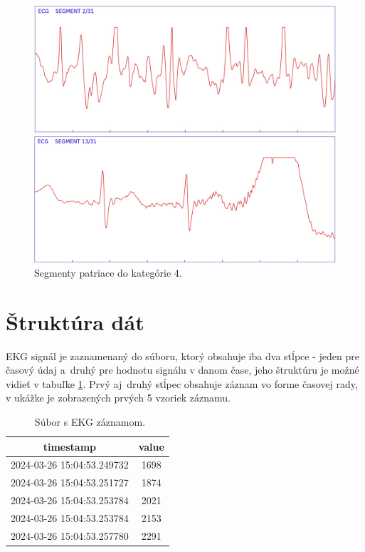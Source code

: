 \begin{figure}[H]
    \centering    
    \includegraphics[scale=0.25]{img/artefact_4.jpeg}
    \par \vspace{0.25cm}
    \includegraphics[scale=0.25]{img/artefact_4_1.jpeg}
    \caption{Segmenty patriace do kategórie 4.}
    \label{fig:artefact_4}
\end{figure}

\newpage


\section{Štruktúra dát}

EKG signál je zaznamenaný do súboru, ktorý obsahuje iba dva stĺpce - jeden pre časový údaj a~druhý pre hodnotu signálu v danom čase, jeho štruktúru je možné vidieť v tabuľke \ref{tab:input}. Prvý aj~druhý stĺpec obsahuje záznam vo forme časovej rady, v ukážke je zobrazených prvých 5 vzoriek záznamu.

\begin{table}[H]\centering
\caption[Súbor s EKG záznamom.]{~Súbor s EKG záznamom.}\label{tab:input}
    \begin{tabular}{c|c}
    	\textbf{timestamp} 	        & \textbf{value}   \tabularnewline \hline 
     	2024-03-26 15:04:53.249732  & 1698	           \tabularnewline \hline
     	2024-03-26 15:04:53.251727 	& 1874	           \tabularnewline \hline
        2024-03-26 15:04:53.253784 	& 2021	           \tabularnewline \hline
        2024-03-26 15:04:53.253784  & 2153	           \tabularnewline \hline
        2024-03-26 15:04:53.257780  & 2291	           \tabularnewline
    \end{tabular}
\end{table}

